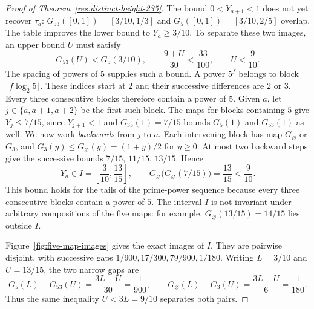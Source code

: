 \documentclass[11pt]{article}
\begin{document}
\begin{proof}[Proof of Theorem~\ref{res:distinct-height-235}]
The bound $0<Y_{a+1}<1$ does not yet recover $\tau_a$:
$G_{53}([0,1])=[3/10,1/3]$ and $G_5([0,1])=[3/10,2/5]$ overlap.
The table improves the lower bound to $Y_a\ge3/10$. To separate these
two images, an upper bound $U$ must satisfy
\[
 G_{53}(U)<G_5(3/10),\qquad
 \frac{9+U}{30}<\frac{33}{100},\qquad U<\frac9{10}.
\]
The spacing of powers of $5$ supplies such a bound.
A power $5^f$ belongs to block $\lfloor f\log_2 5\rfloor$. These
indices start at $2$ and their successive differences are $2$ or $3$.
Every three consecutive blocks therefore contain a power of $5$.
Given $a$, let $j\in\{a,a+1,a+2\}$ be the first such block. The maps
for blocks containing $5$ give $Y_j\le7/15$, since $Y_{j+1}<1$ and
$G_{35}(1)=7/15$ bounds $G_5(1)$ and $G_{53}(1)$ as well.
We now work \emph{backwards} from $j$ to $a$. Each intervening block
has map $G_\varnothing$ or $G_3$, and
$G_3(y)\le G_\varnothing(y)=(1+y)/2$ for $y\ge0$.
At most two backward steps give the successive bounds
$7/15$, $11/15$, $13/15$. Hence
\begin{equation}\label{eq:five-interval}
 Y_a\in I=\left[\frac3{10},\frac{13}{15}\right],\qquad
 G_\varnothing\bigl(G_\varnothing(7/15)\bigr)=\frac{13}{15}<\frac9{10}.
\end{equation}
This bound holds for the tails of the prime-power sequence because
every three consecutive blocks contain a power of $5$. The interval
$I$ is not invariant under arbitrary compositions of the five maps:
for example, $G_\varnothing(13/15)=14/15$ lies outside $I$.

Figure~\ref{fig:five-map-images} gives the exact images of $I$. They
are pairwise disjoint, with successive gaps
$1/900,17/300,79/900,1/180$. Writing $L=3/10$ and $U=13/15$, the two
narrow gaps are
\[
 G_5(L)-G_{53}(U)=\frac{3L-U}{30}=\frac1{900},\qquad
 G_\varnothing(L)-G_3(U)=\frac{3L-U}{6}=\frac1{180}.
\]
Thus the same inequality $U<3L=9/10$ separates both pairs.


\end{proof}
\end{document}
